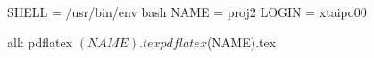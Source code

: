 SHELL = /usr/bin/env bash
NAME = proj2
LOGIN = xtaipo00

all:
	pdflatex $(NAME).tex
	pdflatex $(NAME).tex
